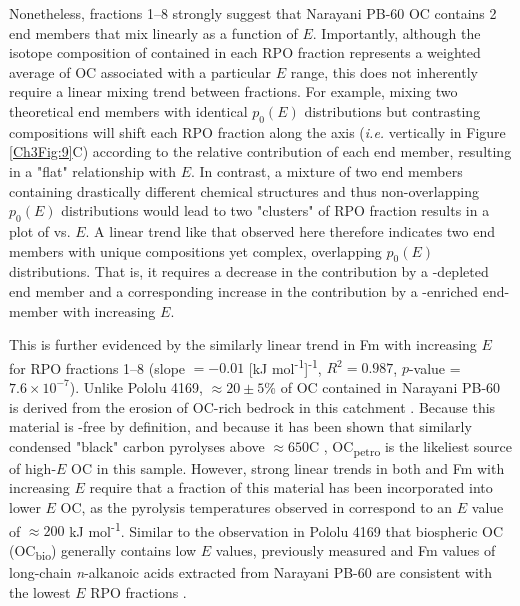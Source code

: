 Nonetheless, fractions 1--8 strongly suggest that Narayani PB-60 OC contains 2 end members that mix linearly as a function of $E$. Importantly, although the isotope composition of  contained in each RPO fraction represents a weighted average of OC associated with a particular $E$ range, this does not inherently require a linear mixing trend between fractions. For example, mixing two theoretical end members with identical $p_{0}(E)$ distributions but contrasting  compositions will shift each RPO fraction along the  axis (\textit{i.e.} vertically in Figure \ref{Ch3Fig:9}C) according to the relative contribution of each end member, resulting in a "flat"  relationship with $E$. In contrast, a mixture of two end members containing drastically different chemical structures and thus non-overlapping $p_{0}(E)$ distributions would lead to two "clusters" of RPO fraction results in a plot of  vs. $E$. A linear trend like that observed here therefore indicates two end members with unique  compositions yet complex, overlapping $p_{0}(E)$ distributions. That is, it requires a decrease in the contribution by a -depleted end member and a corresponding increase in the contribution by a -enriched end-member with increasing $E$. 

This is further evidenced by the similarly linear trend in Fm with increasing $E$ for RPO fractions 1--8 (slope $= -0.01$ [kJ mol\textsuperscript{-1}]\textsuperscript{-1}, $R^{2} = 0.987$, $p$-value = $7.6 \times 10^{-7}$). Unlike Pololu 4169, $\approx 20 \pm 5$\% of OC contained in Narayani PB-60 is derived from the erosion of OC-rich bedrock in this catchment \citep[OC\textsubscript{petro};][]{Galy:2008ff,Rosenheim:2012kh}. Because this material is -free by definition, and because it has been shown that similarly condensed "black" carbon pyrolyses above $\approx 650$\textdegree C \citep{Williams:2014bq}, OC\textsubscript{petro} is the likeliest source of high-$E$ OC in this sample. However, strong linear trends in both  and Fm with increasing $E$ require that a fraction of this material has been incorporated into lower $E$ OC, as the pyrolysis temperatures observed in \citet{Williams:2014bq} correspond to an $E$ value of $\approx 200$ kJ mol\textsuperscript{-1}. Similar to the observation in Pololu 4169 that biospheric OC (OC\textsubscript{bio}) generally contains low $E$ values, previously measured  and Fm values of long-chain \textit{n}-alkanoic acids extracted from Narayani PB-60 are consistent with the lowest $E$ RPO fractions \citep[Figure \ref{Ch3Fig:9}C--D;][]{Galy:2011hk,Galy:2011ix}. 

